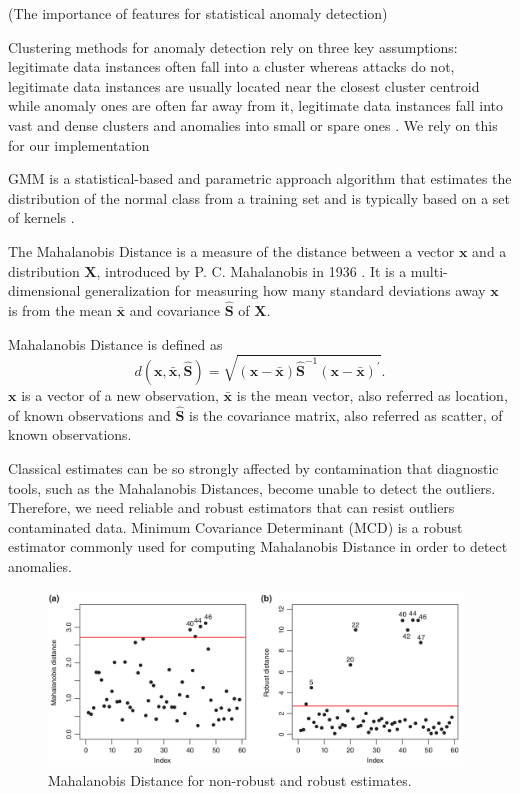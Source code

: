 \documentclass[review]{elsarticle}
\begin{document}
\cite{goldberg2015importance} (The importance of features for statistical anomaly detection)

Clustering methods for anomaly detection rely on three key assumptions: legitimate data instances often fall into a cluster whereas attacks do not, legitimate data instances are usually located near the closest cluster centroid while anomaly ones are often far away from it, legitimate data instances fall into vast and dense clusters and anomalies into small or spare ones \cite{ahmed2016survey, moustafa2019holistic}. We rely on this for our implementation

GMM is a statistical-based and parametric approach algorithm that estimates the distribution of the normal class from a training set and is typically based on a set of kernels \cite{moustafa2019holistic}.

The Mahalanobis Distance is a measure of the distance between a vector $\boldsymbol{x}$ and a distribution $\boldsymbol{X}$, introduced by P. C. Mahalanobis in 1936 \cite{mahalanobis1936md}. It is a multi-dimensional generalization for measuring how many standard deviations away $\boldsymbol{x}$ is from the mean $\boldsymbol{\bar{x}}$ and covariance $\boldsymbol{\hat{S}}$ of $\boldsymbol{X}$.

Mahalanobis Distance is defined as		
	\begin{equation}\label{eq:eq01}
		d(\boldsymbol{x},\bar{\boldsymbol{x}}, \boldsymbol{\hat{S}}) = \sqrt{(\boldsymbol{x} - \bar{\boldsymbol{x}}) \boldsymbol{\hat{S}}^{-1}(\boldsymbol{x} - \bar{\boldsymbol{x}})^\prime}.
	\end{equation}
$\boldsymbol{x}$ is a vector of a new observation, $\bar{\boldsymbol{x}}$ is the mean vector, also referred as location, of known observations and $\boldsymbol{\hat{S}}$ is the covariance matrix, also referred as scatter, of known observations.

Classical estimates can be so strongly affected by contamination that diagnostic tools, such as the Mahalanobis Distances, become unable to detect the outliers. Therefore, we need reliable and robust estimators that can resist outliers contaminated data. Minimum Covariance Determinant (MCD) \cite{rousseeuw1984mcd} is a robust estimator commonly used for computing Mahalanobis Distance in order to detect anomalies.

\begin{figure}[h!]
     \centering
     \includegraphics[width=11cm]{figures/mahalanobis_robust.png}
     \caption{Mahalanobis Distance for non-robust and robust estimates.}
     \label{fig:fig04}
\end{figure}
\end{document}

